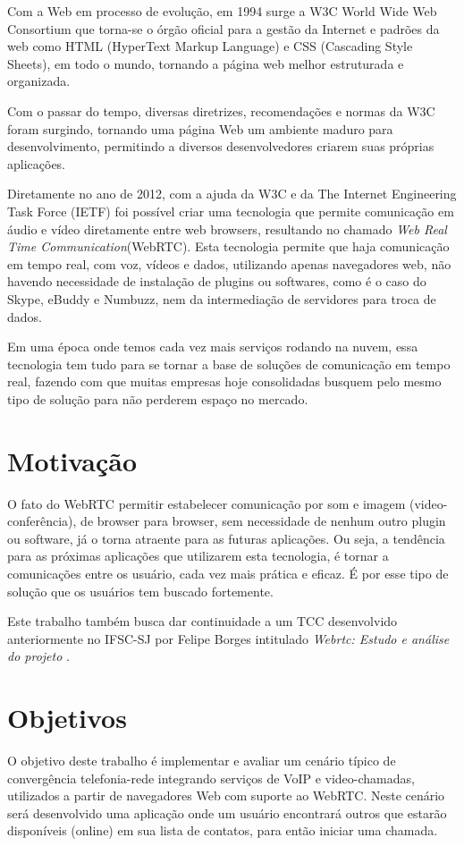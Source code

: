 \documentclass[ruledheader]{abnt} %
\begin{document}
Com a Web em processo de evolução, em 1994 surge a W3C World Wide Web Consortium  que torna-se o órgão oficial para a gestão da Internet e padrões da web como HTML (HyperText Markup Language) e CSS (Cascading Style Sheets), em todo o mundo, tornando a página web melhor estruturada e organizada.

Com o passar do tempo, diversas diretrizes, recomendações e normas da W3C foram surgindo, tornando uma página Web um ambiente maduro para desenvolvimento, permitindo a diversos desenvolvedores criarem suas próprias aplicações. 

Diretamente no ano de 2012, com a ajuda da W3C e da The Internet Engineering Task Force (IETF)  foi possível criar uma tecnologia que permite comunicação em áudio e vídeo diretamente entre web browsers, resultando no chamado \textit{Web Real Time Communication}(WebRTC). Esta tecnologia permite que haja comunicação em tempo real, com voz, vídeos e dados, utilizando apenas navegadores web, não havendo necessidade de instalação de plugins ou softwares, como é o caso do Skype, eBuddy e Numbuzz, nem da intermediação de servidores para troca de dados.
	
Em uma época onde temos cada vez mais serviços rodando na nuvem, essa tecnologia tem tudo para se tornar a base de soluções de comunicação em tempo real, fazendo com que muitas empresas hoje consolidadas busquem pelo mesmo tipo de solução para não perderem espaço no mercado.

\section{Motivação}
\label{s_motivacao} %
O fato do WebRTC permitir estabelecer comunicação por som e imagem (video-conferência), de browser para browser, sem necessidade de nenhum outro plugin ou software, já o torna atraente para as futuras aplicações. Ou seja, a tendência para as próximas aplicações que utilizarem esta tecnologia, é tornar a comunicações entre os usuário, cada vez mais prática e eficaz. É por esse tipo de solução que os usuários tem buscado fortemente. 

Este trabalho também busca dar continuidade a um TCC desenvolvido anteriormente no IFSC-SJ por Felipe Borges intitulado \textit{Webrtc: Estudo e análise do projeto} \cite{Borges:2013}.


\section{Objetivos}
\label{s_objetivos} %
O objetivo deste trabalho é implementar e avaliar um cenário típico de convergência telefonia-rede integrando serviços de VoIP e video-chamadas, utilizados a partir de navegadores Web  com suporte ao WebRTC. Neste cenário será desenvolvido uma aplicação onde um usuário encontrará outros que estarão disponíveis (online) em sua lista de contatos, para então iniciar uma chamada. 
\end{document}
